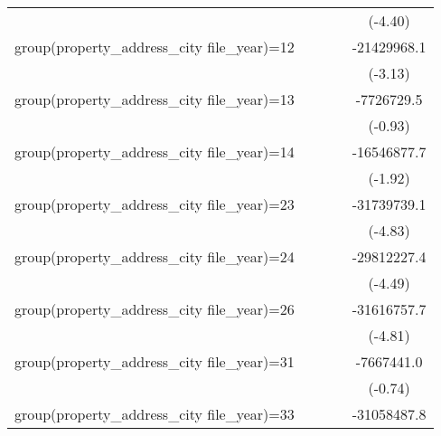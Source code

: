 {\begin{tabular}{l*{4}{c}}
                    &                     &                     &                     &     (-4.40)         \\
\addlinespace
group(property\_address\_city file\_year)=12&                     &                     &                     & -21429968.1\sym{**} \\
                    &                     &                     &                     &     (-3.13)         \\
\addlinespace
group(property\_address\_city file\_year)=13&                     &                     &                     &  -7726729.5         \\
                    &                     &                     &                     &     (-0.93)         \\
\addlinespace
group(property\_address\_city file\_year)=14&                     &                     &                     & -16546877.7         \\
                    &                     &                     &                     &     (-1.92)         \\
\addlinespace
group(property\_address\_city file\_year)=23&                     &                     &                     & -31739739.1\sym{***}\\
                    &                     &                     &                     &     (-4.83)         \\
\addlinespace
group(property\_address\_city file\_year)=24&                     &                     &                     & -29812227.4\sym{***}\\
                    &                     &                     &                     &     (-4.49)         \\
\addlinespace
group(property\_address\_city file\_year)=26&                     &                     &                     & -31616757.7\sym{***}\\
                    &                     &                     &                     &     (-4.81)         \\
\addlinespace
group(property\_address\_city file\_year)=31&                     &                     &                     &  -7667441.0         \\
                    &                     &                     &                     &     (-0.74)         \\
\addlinespace
group(property\_address\_city file\_year)=33&                     &                     &                     & -31058487.8\sym{***}\\

\end{tabular}}
